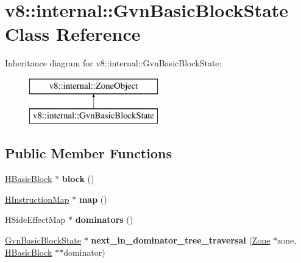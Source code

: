 \hypertarget{classv8_1_1internal_1_1_gvn_basic_block_state}{}\section{v8\+:\+:internal\+:\+:Gvn\+Basic\+Block\+State Class Reference}
\label{classv8_1_1internal_1_1_gvn_basic_block_state}
Inheritance diagram for v8\+:\+:internal\+:\+:Gvn\+Basic\+Block\+State\+:\begin{figure}[H]
\begin{center}
\leavevmode
\includegraphics[height=2.000000cm]{classv8_1_1internal_1_1_gvn_basic_block_state}
\end{center}
\end{figure}
\subsection*{Public Member Functions}
\begin{DoxyCompactItemize}
\item 
\hyperlink{classv8_1_1internal_1_1_h_basic_block}{H\+Basic\+Block} $\ast$ {\bfseries block} ()\hypertarget{classv8_1_1internal_1_1_gvn_basic_block_state_af243d97cb1c2d7f39c0dcce5a404a101}{}\label{classv8_1_1internal_1_1_gvn_basic_block_state_af243d97cb1c2d7f39c0dcce5a404a101}

\item 
\hyperlink{classv8_1_1internal_1_1_h_instruction_map}{H\+Instruction\+Map} $\ast$ {\bfseries map} ()\hypertarget{classv8_1_1internal_1_1_gvn_basic_block_state_a6f5961f87371e7727d95e30b14fb338b}{}\label{classv8_1_1internal_1_1_gvn_basic_block_state_a6f5961f87371e7727d95e30b14fb338b}

\item 
H\+Side\+Effect\+Map $\ast$ {\bfseries dominators} ()\hypertarget{classv8_1_1internal_1_1_gvn_basic_block_state_a28a43fe653ea405cc2493748b8db3b33}{}\label{classv8_1_1internal_1_1_gvn_basic_block_state_a28a43fe653ea405cc2493748b8db3b33}

\item 
\hyperlink{classv8_1_1internal_1_1_gvn_basic_block_state}{Gvn\+Basic\+Block\+State} $\ast$ {\bfseries next\+\_\+in\+\_\+dominator\+\_\+tree\+\_\+traversal} (\hyperlink{classv8_1_1internal_1_1_zone}{Zone} $\ast$zone, \hyperlink{classv8_1_1internal_1_1_h_basic_block}{H\+Basic\+Block} $\ast$$\ast$dominator)\hypertarget{classv8_1_1internal_1_1_gvn_basic_block_state_a4a094a126cafa4189acd01cdc3119fcb}{}\label{classv8_1_1internal_1_1_gvn_basic_block_state_a4a094a126cafa4189acd01cdc3119fcb}

\end{DoxyCompactItemize}

